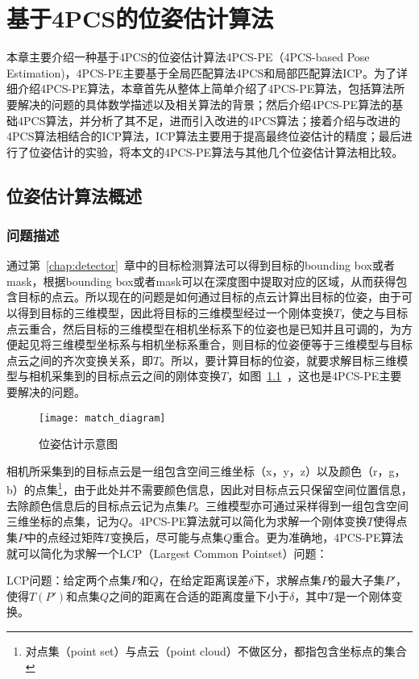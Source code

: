 \chapter{基于4PCS的位姿估计算法}
\label{chap:matcher}
本章主要介绍一种基于4PCS的位姿估计算法4PCS-PE（4PCS-based Pose Estimation)，4PCS-PE主要基于全局匹配算法4PCS\cite{aiger20084}和局部匹配算法ICP\cite{besl1992method}。为了详细介绍4PCS-PE算法，本章首先从整体上简单介绍了4PCS-PE算法，包括算法所要解决的问题的具体数学描述以及相关算法的背景；然后介绍4PCS-PE算法的基础4PCS算法，并分析了其不足，进而引入改进的4PCS算法；接着介绍与改进的4PCS算法相结合的ICP算法，ICP算法主要用于提高最终位姿估计的精度；最后进行了位姿估计的实验，将本文的4PCS-PE算法与其他几个位姿估计算法相比较。

\section{位姿估计算法概述}
\subsection{问题描述}
通过第~\ref{chap:detector}~章中的目标检测算法可以得到目标的bounding box或者mask，根据bounding box或者mask可以在深度图中提取对应的区域，从而获得包含目标的点云。所以现在的问题是如何通过目标的点云计算出目标的位姿，由于可以得到目标的三维模型，因此将目标的三维模型经过一个刚体变换$T$，使之与目标点云重合，然后目标的三维模型在相机坐标系下的位姿也是已知并且可调的，为方便起见将三维模型坐标系与相机坐标系重合，则目标的位姿便等于三维模型与目标点云之间的齐次变换关系，即$T$。所以，要计算目标的位姿，就要求解目标三维模型与相机采集到的目标点云之间的刚体变换$T$，如图~\ref{fig:match_diagram}~，这也是4PCS-PE主要要解决的问题。
\begin{figure}[ht]
  \centering
  \texttt{[image: match\_diagram]}
  \caption{位姿估计示意图}
  \label{fig:match_diagram}
\end{figure}

相机所采集到的目标点云是一组包含空间三维坐标（x，y，z）以及颜色（r，g，b）的点集\footnote{对点集（point set）与点云（point cloud）不做区分，都指包含坐标点的集合}，由于此处并不需要颜色信息，因此对目标点云只保留空间位置信息，去除颜色信息后的目标点云记为点集$P$。三维模型亦可通过采样得到一组包含空间三维坐标的点集，记为$Q$。4PCS-PE算法就可以简化为求解一个刚体变换$T$使得点集$P$中的点经过矩阵$T$变换后，尽可能与点集$Q$重合。更为准确地，4PCS-PE算法就可以简化为求解一个LCP（Largest Common Pointset）问题：

{\kai LCP问题：给定两个点集$P$和$Q$，在给定距离误差$\delta$下，求解点集$P$的最大子集$P'$，使得$T(P')$和点集$Q$之间的距离在合适的距离度量下小于$\delta$，其中$T$是一个刚体变换。}

